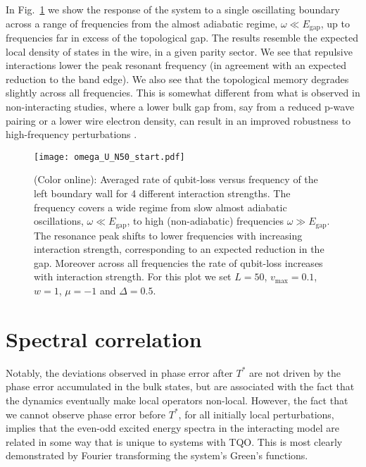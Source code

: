 \documentclass[aps,pra,floatfix,footinbib,longbibliography,twocolumn,superscriptaddress, preprintnumbers, nobibnotes]{revtex4-1}
\begin{document}
In Fig.~\ref{fig:omegaU_Qubitloss} we show the response of the system to a single oscillating boundary across a range of frequencies from the almost adiabatic regime, $\omega \ll E_{\text{gap}}$, up to frequencies far in excess of the topological gap. The results resemble the expected local density of states in the wire, in a given parity sector. We see that repulsive interactions lower the peak resonant frequency (in agreement with an expected reduction to the band edge). We also see that the topological memory degrades slightly across all frequencies. This is somewhat different from what is observed in non-interacting studies, where a lower bulk gap from, say from a reduced p-wave pairing or a lower wire electron density, can result in an improved robustness to high-frequency perturbations \cite{Conlon2019}.

\begin{figure}[ht!]
    \centering
    \texttt{[image: omega\_U\_N50\_start.pdf]}
    \caption{(Color online): Averaged rate of qubit-loss versus frequency of the left boundary wall for 4 different interaction strengths. The frequency covers a wide regime from slow almost adiabatic oscillations, $\omega \ll E_{\text{gap}}$, to high (non-adiabatic) frequencies $\omega \gg E_{\text{gap}}$. The resonance peak shifts to lower frequencies with increasing interaction strength, corresponding to an expected reduction in the gap. Moreover across all frequencies the rate of qubit-loss increases with interaction strength. For this plot we set $L=50$, $v_{\text{max}}=0.1$, $w=1$, $\mu = -1$ and $\Delta = 0.5$. }
   \label{fig:omegaU_Qubitloss}
\end{figure}

\section{Spectral correlation} Notably, the deviations observed in phase error after $T^*$ are not driven by the phase error accumulated in the bulk states, but are associated with the fact that the dynamics eventually make local operators non-local. However, the fact that we cannot observe phase error before $T^*$, for all initially local perturbations, implies that the even-odd excited energy spectra in the interacting model are related in some way that is unique to systems with TQO.  This is most clearly demonstrated by Fourier transforming the system's Green's functions.
\end{document}
